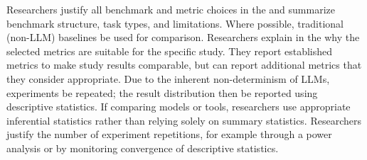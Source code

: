 Researchers \must justify all benchmark and metric choices in the \paper and \should summarize benchmark structure, task types, and limitations. Where possible, traditional (non-LLM) baselines \should be used for comparison. Researchers \must explain in the \paper why the selected metrics are suitable for the specific study. They \should report established metrics to make study results comparable, but can report additional metrics that they consider appropriate. Due to the inherent non-determinism of LLMs, experiments \should be repeated; the result distribution \should then be reported using descriptive statistics. If comparing models or tools, researchers \must use appropriate inferential statistics rather than relying solely on summary statistics. Researchers \should justify the number of experiment repetitions, for example through a power analysis or by monitoring convergence of descriptive statistics.